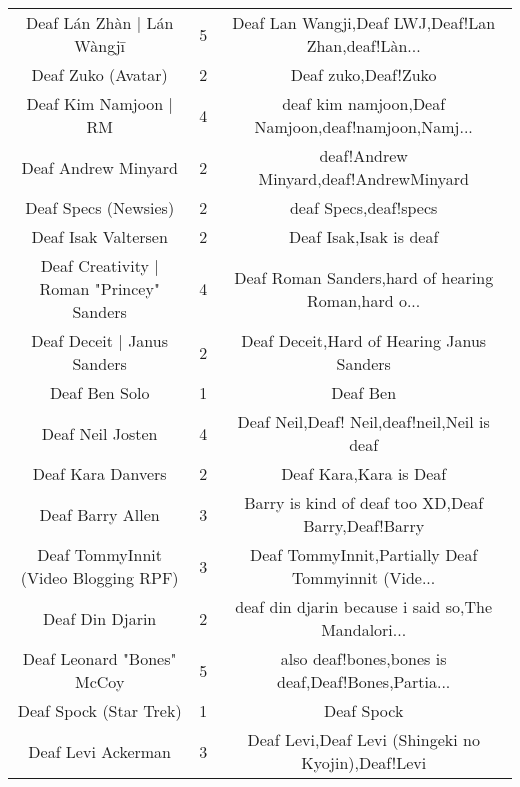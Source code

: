 \begin{table}[h!]
{\begin{tabular}{|c|c|c|}
                        Deaf Lán Zhàn | Lán Wàngjī &      5 & Deaf Lan Wangji,Deaf LWJ,Deaf!Lan Zhan,deaf!Làn... \\
                                Deaf Zuko (Avatar) &      2 &                                Deaf zuko,Deaf!Zuko \\
                             Deaf Kim Namjoon | RM &      4 & deaf kim namjoon,Deaf Namjoon,deaf!namjoon,Namj... \\
                               Deaf Andrew Minyard &      2 &             deaf!Andrew Minyard,deaf!AndrewMinyard \\
                              Deaf Specs (Newsies) &      2 &                              deaf Specs,deaf!specs \\
                               Deaf Isak Valtersen &      2 &                             Deaf Isak,Isak is deaf \\
         Deaf Creativity | Roman "Princey" Sanders &      4 & Deaf Roman Sanders,hard of hearing Roman,hard o... \\
                       Deaf Deceit | Janus Sanders &      2 &          Deaf Deceit,Hard of Hearing Janus Sanders \\
                                     Deaf Ben Solo &      1 &                                           Deaf Ben \\
                                  Deaf Neil Josten &      4 &        Deaf Neil,Deaf! Neil,deaf!neil,Neil is deaf \\
                                 Deaf Kara Danvers &      2 &                             Deaf Kara,Kara is Deaf \\
                                  Deaf Barry Allen &      3 & Barry is kind of deaf too XD,Deaf Barry,Deaf!Barry \\
              Deaf TommyInnit (Video Blogging RPF) &      3 & Deaf TommyInnit,Partially Deaf Tommyinnit (Vide... \\
                                   Deaf Din Djarin &      2 & deaf din djarin because i said so,The Mandalori... \\
                        Deaf Leonard "Bones" McCoy &      5 & also deaf!bones,bones is deaf,Deaf!Bones,Partia... \\
                            Deaf Spock (Star Trek) &      1 &                                         Deaf Spock \\
                                Deaf Levi Ackerman &      3 & Deaf Levi,Deaf Levi (Shingeki no Kyojin),Deaf!Levi \\

\end{tabular}}
\end{table}
